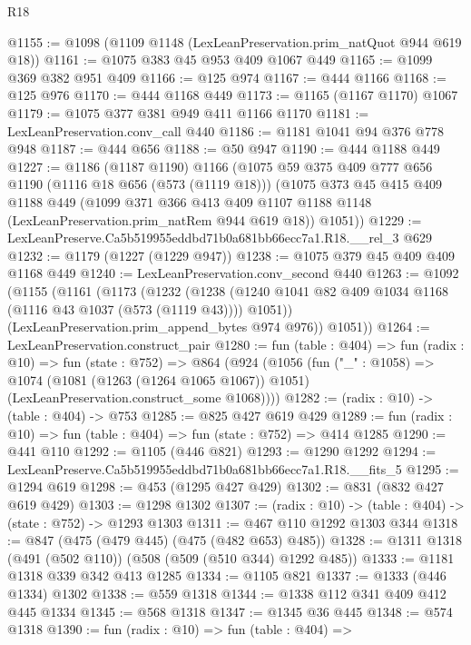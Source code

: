 \begin{lexlean}{R18}
\begin{coremodule}
@1155 := @1098 (@1109 @1148 (LexLeanPreservation.prim_natQuot @944 @619 @18))
@1161 := @1075 @383 @45 @953 @409 @1067 @449
@1165 := @1099 @369 @382 @951 @409
@1166 := @125 @974
@1167 := @444 @1166
@1168 := @125 @976
@1170 := @444 @1168 @449
@1173 := @1165 (@1167 @1170) @1067
@1179 := @1075 @377 @381 @949 @411 @1166 @1170
@1181 := LexLeanPreservation.conv_call @440
@1186 := @1181 @1041 @94 @376 @778 @948
@1187 := @444 @656
@1188 := @50 @947
@1190 := @444 @1188 @449
@1227 := @1186
    (@1187 @1190)
    @1166
    (@1075
      @59
      @375
      @409
      @777
      @656
      @1190
      (@1116 @18 @656 (@573 (@1119 @18)))
      (@1075
        @373
        @45
        @415
        @409
        @1188
        @449
        (@1099
          @371
          @366
          @413
          @409
          @1107
          @1188
          @1148
          (LexLeanPreservation.prim_natRem @944 @619 @18))
        @1051))
@1229 := LexLeanPreserve.Ca5b519955eddbd71b0a681bb66ecc7a1.R18.__rel_3 @629
@1232 := @1179 (@1227 (@1229 @947))
@1238 := @1075 @379 @45 @409 @409 @1168 @449
@1240 := LexLeanPreservation.conv_second @440
@1263 := @1092
    (@1155
      (@1161
        (@1173
          (@1232
            (@1238 (@1240 @1041 @82 @409 @1034 @1168 (@1116 @43 @1037 (@573 (@1119 @43)))) @1051))
          (LexLeanPreservation.prim_append_bytes @974 @976))
        @1051))
@1264 := LexLeanPreservation.construct_pair
@1280 := fun (table : @404) =>
  fun (radix : @10) =>
  fun (state : @752) =>
  @864
    (@924
      (@1056
        (fun ("_" : @1058) =>
        @1074
          (@1081 (@1263 (@1264 @1065 @1067)) @1051)
          (LexLeanPreservation.construct_some @1068))))
@1282 := (radix : @10) -> (table : @404) -> @753
@1285 := @825 @427 @619 @429
@1289 := fun (radix : @10) => fun (table : @404) => fun (state : @752) => @414 @1285
@1290 := @441 @110
@1292 := @1105 (@446 @821)
@1293 := @1290 @1292
@1294 := LexLeanPreserve.Ca5b519955eddbd71b0a681bb66ecc7a1.R18.__fits_5
@1295 := @1294 @619
@1298 := @453 (@1295 @427 @429)
@1302 := @831 (@832 @427 @619 @429)
@1303 := @1298 @1302
@1307 := (radix : @10) -> (table : @404) -> (state : @752) -> @1293 @1303
@1311 := @467 @110 @1292 @1303 @344
@1318 := @847 (@475 (@479 @445) (@475 (@482 @653) @485))
@1328 := @1311 @1318 (@491 (@502 @110)) (@508 (@509 (@510 @344) @1292 @485))
@1333 := @1181 @1318 @339 @342 @413 @1285
@1334 := @1105 @821
@1337 := @1333 (@446 @1334) @1302
@1338 := @559 @1318
@1344 := @1338 @112 @341 @409 @412 @445 @1334
@1345 := @568 @1318
@1347 := @1345 @36 @445
@1348 := @574 @1318
@1390 := fun (radix : @10) =>
  fun (table : @404) =>

\end{coremodule}
\end{lexlean}
